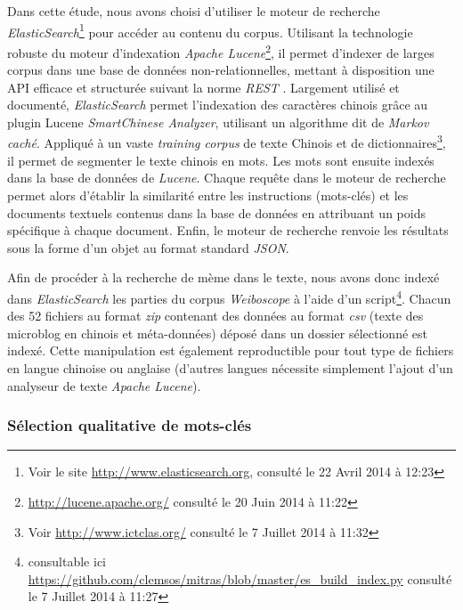     Dans cette étude, nous avons choisi d'utiliser le moteur de recherche \textit{ElasticSearch}\footnote{Voir le site \url{http://www.elasticsearch.org}, consulté le 22 Avril 2014 à 12:23} pour accéder au contenu du corpus. Utilisant la technologie robuste du moteur d'indexation \textit{Apache Lucene}\footnote{ \url{http://lucene.apache.org/} consulté le 20 Juin 2014 à 11:22}, il permet d'indexer de larges corpus dans une base de données non-relationnelles, mettant à disposition une API efficace et structurée suivant la norme \textit{REST} \citep{Masse2012}. Largement utilisé et documenté, \textit{ElasticSearch} permet l'indexation des caractères chinois grâce au plugin Lucene \textit{SmartChinese Analyzer}, utilisant un algorithme dit de \textit{Markov caché}. Appliqué à un vaste \textit{training corpus} de texte Chinois et de dictionnaires\footnote{Voir \url{http://www.ictclas.org/} consulté le 7 Juillet 2014 à 11:32}, il permet de segmenter le texte chinois en mots. Les mots sont ensuite indexés dans la base de données de \textit{Lucene}. Chaque requête dans le moteur de recherche permet alors d'établir la similarité entre les instructions (mots-clés) et les documents textuels contenus dans la base de données en attribuant un poids spécifique à chaque document. Enfin, le moteur de recherche renvoie les résultats sous la forme d'un objet au format standard \textit{JSON}.

    Afin de procéder à la recherche de mème dans le texte, nous avons donc indexé dans \textit{ElasticSearch} les parties du corpus \textit{Weiboscope} à l'aide d'un script\footnote{consultable ici \url{https://github.com/clemsos/mitras/blob/master/es_build_index.py} consulté le 7 Juillet 2014 à 11:27}. Chacun des 52 fichiers au format \textit{zip} contenant des données au format \textit{csv} (texte des microblog en chinois et méta-données) déposé dans un dossier sélectionné est indexé. Cette manipulation est également reproductible pour tout type de fichiers en langue chinoise ou anglaise (d'autres langues nécessite simplement l'ajout d'un analyseur de texte \textit{Apache Lucene}).

\subsubsection[Sélection qualitative de mots-clés]{Sélection qualitative de mots-clés}

